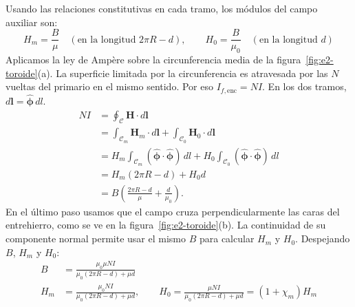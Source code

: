 \documentclass[11pt]{article}
\begin{document}
Usando las relaciones constitutivas en cada tramo, los módulos del campo auxiliar son:
\begin{equation}
    H_m = \frac{B}{\mu} \quad (\text{en la longitud } 2\pi R - d), \qquad H_0 = \frac{B}{\mu_0} \quad (\text{en la longitud } d)
\end{equation}
Aplicamos la ley de Ampère sobre la circunferencia media de la
figura~\ref{fig:e2-toroide}(a). La superficie limitada por la
circunferencia es atravesada por las $N$ vueltas del primario
en el mismo sentido. Por eso $I_{f,\mathrm{enc}}=NI$.
En los dos tramos, $d\mathbf l=\hat{\boldsymbol\phi}\,dl$.
\begin{align*}
    NI
    &=\oint_{\mathcal C}\mathbf H\cdot d\mathbf l\\
    &=\int_{\mathcal C_m}\mathbf H_m\cdot d\mathbf l
       +\int_{\mathcal C_0}\mathbf H_0\cdot d\mathbf l\\
    &=H_m\int_{\mathcal C_m}
          (\hat{\boldsymbol\phi}\cdot\hat{\boldsymbol\phi})\,dl
      +H_0\int_{\mathcal C_0}
          (\hat{\boldsymbol\phi}\cdot\hat{\boldsymbol\phi})\,dl\\
    &=H_m(2\pi R-d)+H_0 d\\
    &=B\left(\frac{2\pi R-d}{\mu}+\frac{d}{\mu_0}\right).
\end{align*}
En el último paso usamos que el campo cruza perpendicularmente
las caras del entrehierro, como se ve en la
figura~\ref{fig:e2-toroide}(b). La continuidad de su componente
normal permite usar el mismo $B$ para calcular $H_m$ y $H_0$.
Despejando $B$, $H_m$ y $H_0$:
\begin{align}
    B &= \frac{\mu_0 \mu N I}{\mu_0(2\pi R - d) + \mu d} \\
    H_m &= \frac{\mu_0 N I}{\mu_0(2\pi R - d) + \mu d}, \qquad H_0 = \frac{\mu N I}{\mu_0(2\pi R - d) + \mu d} = (1 + \chi_m) H_m
\end{align}
\end{document}
